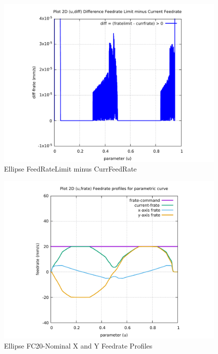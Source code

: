 \begin{figure}
	\caption     {Ellipse FeedRateLimit minus CurrFeedRate}
	\label{12-img-Ellipse-FeedRateLimit-minus-CurrFeedRate.pdf}
	\includegraphics[width=1.00\textwidth]{Chap4/appendix/app-Ellipse/plots/12-img-Ellipse-FeedRateLimit-minus-CurrFeedRate.pdf}
\end{figure}

\clearpage
\pagebreak

\begin{figure}
	\caption     {Ellipse FC20-Nominal X and Y Feedrate Profiles}
	\label{13-img-Ellipse-FC20-Nominal-X-and-Y-Feedrate-Profiles.pdf}
	\includegraphics[width=1.00\textwidth]{Chap4/appendix/app-Ellipse/plots/13-img-Ellipse-FC20-Nominal-X-and-Y-Feedrate-Profiles.pdf}
\end{figure}


